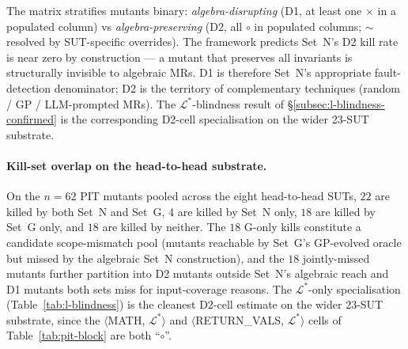 \documentclass[acmsmall, screen]{acmart}
\begin{document}
The matrix stratifies mutants binary: \emph{algebra-disrupting} (D1, at least one $\times$ in a populated column) vs \emph{algebra-preserving} (D2, all $\circ$ in populated columns; $\sim$ resolved by SUT-specific overrides). The framework predicts Set~N's D2 kill rate is near zero by construction --- a mutant that preserves all invariants is structurally invisible to algebraic MRs. D1 is therefore Set~N's appropriate fault-detection denominator; D2 is the territory of complementary techniques (random / GP / LLM-prompted MRs). The $\mathcal{L}^{*}$-blindness result of \S\ref{subsec:l-blindness-confirmed} is the corresponding D2-cell specialisation on the wider 23-SUT substrate.

\paragraph{Kill-set overlap on the head-to-head substrate.}
On the $n = 62$ PIT mutants pooled across the eight head-to-head
SUTs, $22$ are killed by both Set~N and Set~G, $4$ are killed by
Set~N only, $18$ are killed by Set~G only, and $18$ are killed by
neither. The $18$ G-only kills constitute a candidate scope-mismatch
pool (mutants reachable by Set~G's GP-evolved oracle but missed by
the algebraic Set~N construction), and the $18$ jointly-missed
mutants further partition into D2 mutants outside Set~N's algebraic
reach and D1 mutants both sets miss for input-coverage reasons.
The $\mathcal{L}^{*}$-only specialisation
(Table~\ref{tab:l-blindness}) is the cleanest D2-cell estimate on
the wider 23-SUT substrate, since the
$\langle$MATH, $\mathcal{L}^{*}\rangle$ and
$\langle$RETURN\_VALS, $\mathcal{L}^{*}\rangle$ cells of
Table~\ref{tab:pit-block} are both ``$\circ$''.
\end{document}
